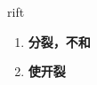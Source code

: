 
\begin{frame}
{\huge rift}
\begin{center}
\begin{enumerate}\Large
  \item \textbf{分裂，不和}
  \item \textbf{使开裂}
\end{enumerate}
\end{center}
\end{frame}
